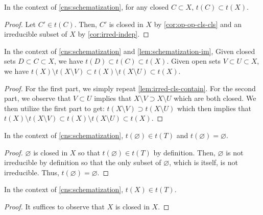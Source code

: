 \begin{lem}\label{lem:irred-cls-contain}
In the context of \cref{cns:schematization}, for any closed
$C \subset X$, $t(C) \subset t(X)$.
\end{lem}
\begin{proof}
Let $C' \in t(C)$. Then, $C'$ is closed in $X$ by
\cref{cor:op-op-cls-cls} and an irreducible subset of $X$
by \cref{cor:irred-indep}.
\end{proof}

\begin{lem}\label{lem:schematization-ord}
In the context of \cref{cns:schematization} and \cref{lem:schematization-im},
Given closed sets $D \subset C \subset X$, we have
$t(D) \subset t(C) \subset t(X)$. Given open sets
$V \subset U \subset X$, we have
$t(X) \setminus t(X \setminus V)
\subset t(X) \setminus t(X \setminus U)
\subset t(X)$.
\end{lem}
\begin{proof}
For the first part, we simply repeat \cref{lem:irred-cls-contain}.
For the second part, we observe that $V \subset U$ implies that
$X \setminus V \supset X \setminus U$ which are both closed. We then
utilize the first part to get:
$t(X \setminus V) \supset t(X \setminus U)$ which then implies
that $t(X) \setminus t(X \setminus V) \subset t(X) \setminus t(X \setminus U)
\subset t(X)$.
\end{proof}

\begin{lem}\label{lem:schematization-empty}
In the context of \cref{cns:schematization},
$t(\varnothing) \in t(T)$ and
$t(\varnothing) = \varnothing$.
\end{lem}
\begin{proof}
$\varnothing$ is closed in $X$ so that $t(\varnothing) \in t(T)$
by definition. Then, $\varnothing$ is not irreducible by definition
so that the only subset of $\varnothing$, which is itself,
is not irreducible. Thus, $t(\varnothing) = \varnothing$.
\end{proof}

\begin{lem}\label{lem:schematization-all}
In the context of \cref{cns:schematization},
$t(X) \in t(T)$.
\end{lem}
\begin{proof}
It suffices to observe that $X$ is closed in $X$.
\end{proof}

